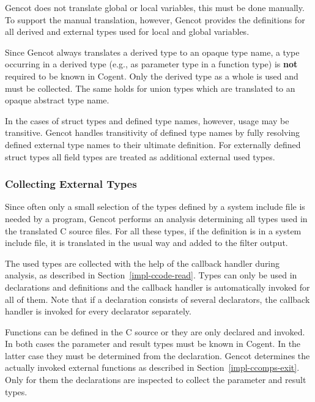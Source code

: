 Gencot does not translate global or local variables, this must be done manually. To support the manual translation, 
however, Gencot provides the definitions for all derived and external types used for local and global variables.

Since Gencot always translates a derived type to an opaque type name, a type occurring in a derived type (e.g.,
as parameter type in a function type) is \textbf{not} required to be known in Cogent. Only the derived type
as a whole is used and must be collected. The same holds for union types which are translated to an opaque
abstract type name.

In the cases of struct types and defined type names, however, usage may be transitive. Gencot handles transitivity
of defined type names by fully resolving defined external type names to their ultimate definition. For externally
defined struct types all field types are treated as additional external used types. 

\subsubsection{Collecting External Types}

Since often only a small selection of the types defined by a system include file is needed by a program, Gencot performs 
an analysis determining all types used in the translated C source files. For all these types, if the definition is in a 
system include file, it is translated in the usual way and added to the filter output.

The used types are collected with the help of the callback handler during analysis, as described in 
Section~\ref{impl-ccode-read}. Types can only be used in declarations and definitions and the callback handler is
automatically invoked for all of them. Note that if a declaration consists of several declarators, the callback
handler is invoked for every declarator separately. 

Functions can be defined in the C source or they are only declared and invoked. In both cases the parameter and result
types must be known in Cogent. In the latter case they must be determined from the declaration. Gencot determines the
actually invoked external functions as described in Section~\ref{impl-ccomps-exit}. Only for them the declarations 
are inspected to collect the parameter and result types.

